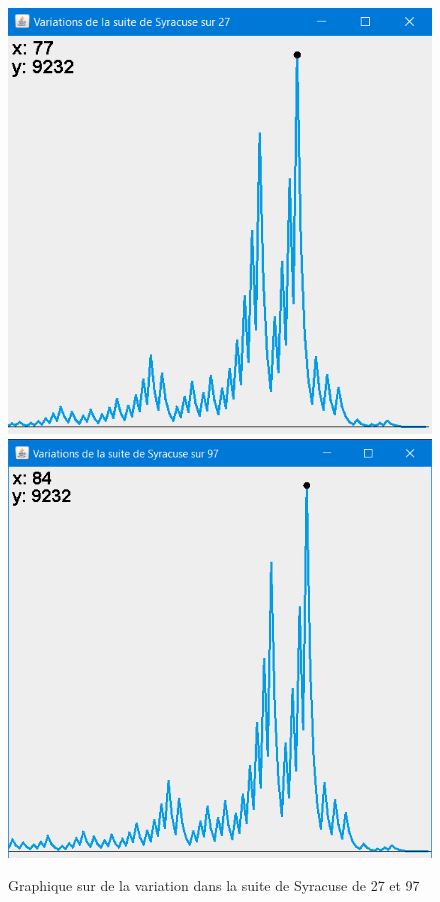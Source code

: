 \begin{figure}[H]
\includegraphics[scale=0.6]{images/syracuse_var_27.PNG}
\includegraphics[scale=0.58]{images/syracuse_var_97.PNG}
\centering
\caption{Graphique sur de la variation dans la suite de Syracuse de 27 et 97}
\end{figure}

